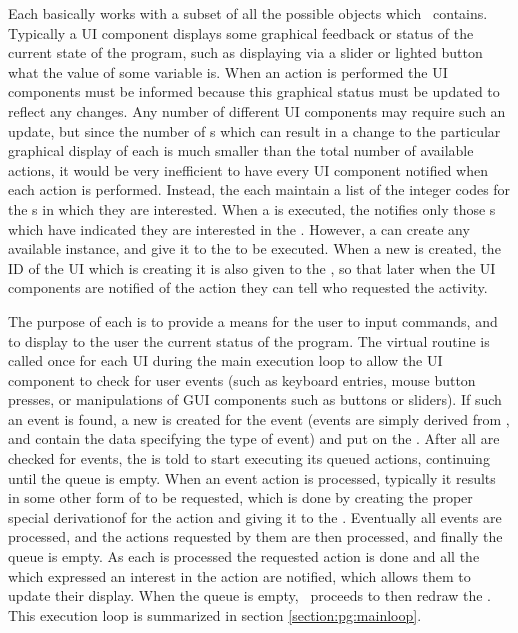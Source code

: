 Each  basically works with a subset of all the possible  objects which \VMD\ contains.  Typically a UI component displays some graphical feedback or status of the current state of the program, such as displaying via a slider or lighted button what the value of some variable is.  When an action is performed the UI components must be informed because this graphical status must be updated to reflect any changes.  Any number of different UI components may require such an update, but since the number of s which can result in a change to the particular graphical display of each  is much smaller than the total number of available actions, it would be very inefficient to have every UI component notified when each action is performed.  Instead, the  each maintain a list of the integer codes for the s in which they are interested.  When a  is executed, the  notifies only those s which have indicated they are interested in the .  However, a  can create any available  instance, and give it to the  to be executed.  When a new  is created, the ID of the UI which is creating it is also given to the , so that later when the UI components are notified of the action they can tell who requested the activity.

The purpose of each  is to provide a means for the user to input commands, and to display to the user the current status of the program.  The virtual routine  is called once for each UI during the main execution loop to allow the UI component to check for user events (such as keyboard entries, mouse button presses, or manipulations of GUI components such as buttons or sliders).  If such an event is found, a new  is created for the event (events are simply derived from , and contain the data specifying the type of event) and put on the .  After all  are checked for events, the  is told to start executing its queued actions, continuing until the queue is empty.  When an event action is processed, typically it results in some other form of  to be requested, which is done by creating the proper special derivationof  for the action and giving it to the .  Eventually all events are processed, and the actions requested by them are then processed, and finally the queue is empty.  As each  is processed the requested action is done and all the  which expressed an interest in the action are notified, which allows them to update their display.  When the queue is empty, \VMD\ proceeds to then redraw the .  This execution loop is summarized in section \ref{section:pg:mainloop}.


